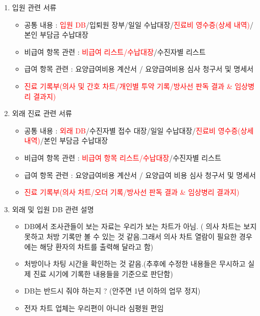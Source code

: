 \begin{enumerate}[①]
\begin{itemize}
	\end{itemize}	
\item 입원 관련 서류
	\begin{itemize}\tightlist
	\item 공통 내용 : \textcolor{red}{입원 DB}/입퇴원 장부/일일 수납대장/\textcolor{red}{진료비 영수증(상세 내역)}/본인 부담금 수납대장 
	\item 비급여 항목 관련 : \textcolor{red}{비급여 리스트/수납대장}/수진자별 리스트
	\item 급여 항목 관련 : 요양급여비용 계산서 / 요양급여비용 심사 청구서 및 명세서
	\item \textcolor{red}{진료 기록부(의사 및 간호 차트/개인별 투약 기록/방사선 판독 결과 \& 임상병리 결과지)}
	\end{itemize}	
\item 외래 진료 관련 서류
	\begin{itemize}\tightlist
	\item 공통 내용 : \textcolor{red}{외래 DB}/수진자별 접수 대장/일일 수납대장/\textcolor{red}{진료비 영수증(상세 내역)}/본인 부담금 수납대장 
	\item 비급여 항목 관련 : \textcolor{red}{비급여 항목 리스트/수납대장}/수진자별 리스트
	\item 급여 항목 관련 : 요양급여비용 계산서 / 요양급여 비용 심사 청구서 및 명세서 
	\item \textcolor{red}{진료 기록부(의사 차트/오더 기록/방사선 판독 결과 \& 임상병리 결과지)}
	\end{itemize}	
\item 외래 및 입원 DB 관련 설명
	\begin{itemize}\tightlist
	\item DB에서 조사관들이 보는 자료는 우리가 보는 차트가 아님.
 ( 의사 차트는 보지 못하고 처방 기록만 볼 수 있는 것 같음.그래서 의사 차트 열람이 필요한 경우에는 해당 환자의 차트를 출력해 달라고 함)
	\item 처방이나 차팅 시간을 확인하는 것 같음.(추후에 수정한 내용들은 무시하고 실제 진료 시기에 기록한 내용들을 기준으로 판단함)
	\item DB는 반드시 줘야 하는지 ? (안주면 1년 이하의 업무 정지)
	\item 전자 차트 업체는 우리편이 아니라 심평원 편임
	\end{itemize}	
\end{enumerate}

